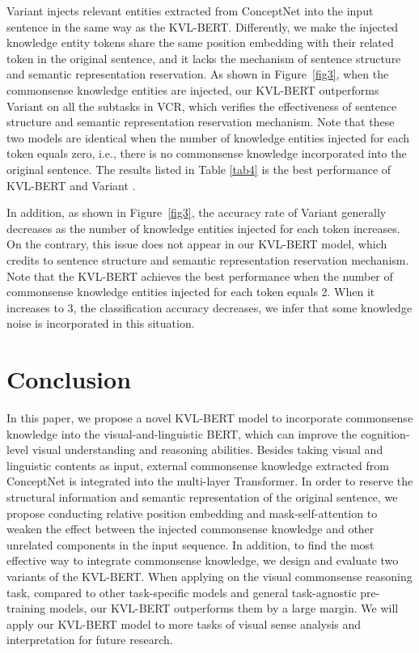 \documentclass[conference]{IEEEtran}
\begin{document}
Variant \uppercase\expandafter{} injects relevant entities extracted from ConceptNet into the input sentence in the same way as the KVL-BERT. Differently, we make the injected knowledge entity tokens share the same position embedding with their related token in the original sentence, and it lacks the mechanism of sentence structure and semantic representation reservation. As shown in Figure~\ref{fig3}, when the commonsense knowledge entities are injected, our KVL-BERT outperforms Variant \uppercase\expandafter{} on all the subtasks in VCR, which verifies the effectiveness of sentence structure and semantic representation reservation mechanism. Note that these two models are identical when the number of knowledge entities injected for each token equals zero, i.e., there is no commonsense knowledge incorporated into the original sentence. The results listed in Table \ref{tab4} is the best performance of KVL-BERT and Variant \uppercase\expandafter{}.
 
 
 

 
 
In addition, as shown in Figure~\ref{fig3}, the accuracy rate of Variant \uppercase\expandafter{} generally decreases as the number of  knowledge entities injected for each token increases. On the contrary, this issue does not appear in our KVL-BERT model, which credits to sentence structure and semantic representation reservation mechanism. Note that the KVL-BERT achieves the best performance when the number of commonsense knowledge entities injected for each token equals 2. When it increases to 3, the classification accuracy decreases, we infer that some knowledge noise is incorporated in this situation.
 













\section{Conclusion}
In this paper, we propose a novel KVL-BERT model to incorporate commonsense knowledge into the visual-and-linguistic BERT, which can improve the cognition-level visual understanding and reasoning abilities. Besides taking visual and linguistic contents as input, external commonsense knowledge extracted from ConceptNet is integrated into the multi-layer Transformer. In order to reserve the structural information and semantic representation of the original sentence, we propose conducting relative position embedding and mask-self-attention to weaken the effect between the injected commonsense knowledge and other unrelated components in the input sequence. In addition, to find the most effective way to integrate commonsense knowledge, we design and evaluate two variants of the KVL-BERT. When applying on the visual commonsense reasoning task, compared to other task-specific models and general task-agnostic pre-training models, our KVL-BERT outperforms them by a large margin. We will apply our KVL-BERT model to more tasks of visual sense analysis and interpretation for future research.
\end{document}
